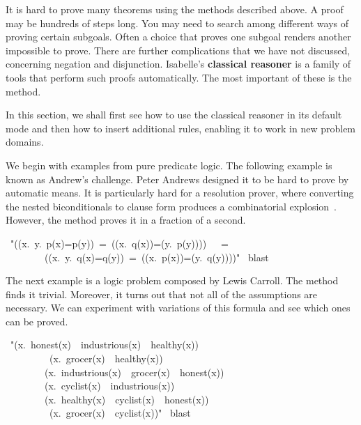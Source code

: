%
It is hard to prove many theorems using the methods 
described above. A proof may be hundreds of steps long.  You 
may need to search among different ways of proving certain 
subgoals. Often a choice that proves one subgoal renders another 
impossible to prove.  There are further complications that we have not
discussed, concerning negation and disjunction.  Isabelle's
\textbf{classical reasoner} is a family of tools that perform such
proofs automatically.  The most important of these is the 
 method. 

In this section, we shall first see how to use the classical 
reasoner in its default mode and then how to insert additional 
rules, enabling it to work in new problem domains. 

 We begin with examples from pure predicate logic. The following 
example is known as Andrew's challenge. Peter Andrews designed 
it to be hard to prove by automatic means.
It is particularly hard for a resolution prover, where 
converting the nested biconditionals to
clause form produces a combinatorial
explosion~\cite{pelletier86}. However, the
 method proves it in a fraction  of a second. 
\begin{isabelle}
\
"(({\isasymexists}x.\
{\isasymforall}y.\
p(x){=}p(y))\
=\
(({\isasymexists}x.\
q(x))=({\isasymforall}y.\
p(y))))\
\ \ =\ \ \ \ \isanewline
\ \ \ \ \ \ \ \
(({\isasymexists}x.\
{\isasymforall}y.\
q(x){=}q(y))\ =\ (({\isasymexists}x.\ p(x))=({\isasymforall}y.\ q(y))))"\isanewline
\isacommand{by}\ blast
\end{isabelle}
The next example is a logic problem composed by Lewis Carroll. 
The \isa{blast} method finds it trivial. Moreover, it turns out 
that not all of the assumptions are necessary. We can  
experiment with variations of this formula and see which ones 
can be proved. 
\begin{isabelle}
\isacommand{lemma}\
"({\isasymforall}x.\
honest(x)\ \isasymand\
industrious(x)\ \isasymlongrightarrow\
healthy(x))\
\isasymand\ \ \isanewline
\ \ \ \ \ \ \ \ \isasymnot\ ({\isasymexists}x.\
grocer(x)\ \isasymand\
healthy(x))\
\isasymand\ \isanewline
\ \ \ \ \ \ \ \ ({\isasymforall}x.\
industrious(x)\ \isasymand\
grocer(x)\ \isasymlongrightarrow\
honest(x))\
\isasymand\ \isanewline
\ \ \ \ \ \ \ \ ({\isasymforall}x.\
cyclist(x)\ \isasymlongrightarrow\
industrious(x))\
\isasymand\ \isanewline
\ \ \ \ \ \ \ \ ({\isasymforall}x.\
{\isasymnot}healthy(x)\ \isasymand\
cyclist(x)\ \isasymlongrightarrow\
{\isasymnot}honest(x))\
\ \isanewline
\ \ \ \ \ \ \ \ \isasymlongrightarrow\
({\isasymforall}x.\
grocer(x)\ \isasymlongrightarrow\
{\isasymnot}cyclist(x))"\isanewline
\isacommand{by}\ blast
\end{isabelle}
